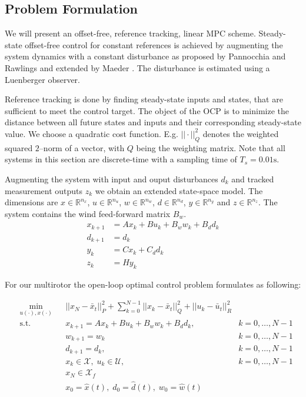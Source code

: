 \subsection{Problem Formulation}
We will present an offset-free, reference tracking, linear MPC scheme. Steady-state offset-free control for constant references is achieved by augmenting the system dynamics with a constant disturbance as proposed by Pannocchia and Rawlings and extended by Maeder \cite{Pannocchia2003a,Maeder2009}. The disturbance is estimated using a Luenberger observer. 

Reference tracking is done by finding steady-state inputs and states, that are sufficient to meet the control target. The object of the OCP is to minimize the distance between all future states and inputs and their corresponding steady-state value. We choose a quadratic cost function. E.g. $||\cdot||_Q^2$ denotes the weighted squared $2$--norm of a vector, with $Q$ being the weighting matrix. Note that all systems in this section are discrete-time with a sampling time of $T_s = 0.01\si{\second}$. 

Augmenting the system with input and ouput disturbances $d_k$ and tracked measurement outputs $z_k$ we obtain an extended state-space model. The dimensions are $x\in\mathbb{R}^{n_x}$, $u\in\mathbb{R}^{n_u}$, $w\in\mathbb{R}^{n_w}$, $d\in\mathbb{R}^{n_d}$, $y\in\mathbb{R}^{n_y}$ and $z\in\mathbb{R}^{n_z}$. The system contains the wind feed-forward matrix $B_w$.
\begin{align}
x_{k+1} &= A x_k + B u_k + B_w w_k + B_d d_k \label{eq:MPC_dt}\\
d_{k+1} &= d_k \nonumber \\ 
y_{k} &= C x_k + C_d d_k \nonumber \\
z_k &= H y_k 
\end{align}

For our multirotor the open-loop optimal control problem formulates as following:

\begin{align}
&\min_{u(\cdot),x(\cdot)}
& & ||x_N-\bar{x}_t||_P^2 + \sum_{k=0}^{N-1} ||x_k - \bar{x}_t||_Q^2 + ||u_k - \bar{u}_t||_R^2  \nonumber\\
& \text{s.t.} 
& & x_{k+1} = A x_k + B u_k + B_w w_k + B_d d_k, & k = 0, \ldots, N-1 \nonumber\\
& & & w_{k+1} = w_k  & k = 0, \ldots, N-1 \nonumber\\
& & & d_{k+1} = d_k, & k = 0, \ldots, N-1 \nonumber\\
& & & x_k \in \mathcal{X}, \; u_k \in \mathcal{U}, & k = 0, \ldots, N-1 \nonumber\\
& & & x_N \in \mathcal{X}_f \nonumber\\
& & & x_0 = \hat x (t), \; d_0 = \hat d(t), \; w_0 = \hat w(t) \label{eq:mpc_opti}
\end{align}

